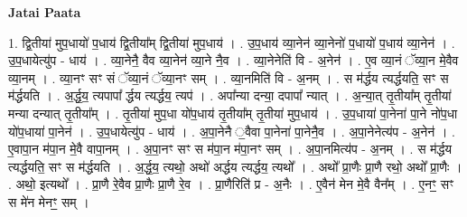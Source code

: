 \documentclass[17pt]{extarticle}
\begin{document}
\textbf{Jatai Paata} \newline

1. द्वि॒तीया॑ मुप॒धायो॑ प॒धाय॑ द्वि॒तीया᳚म् द्वि॒तीया॑ मुप॒धाय॑ । . उ॒प॒धाय॑ व्या॒नेन॑ व्या॒नेनो॑ प॒धायो॑ प॒धाय॑ व्या॒नेन॑ । . उ॒प॒धायेत्यु॑प - धाय॑ । . व्या॒नेनै॒ वैव व्या॒नेन॑ व्या॒ने नै॒व । . व्या॒नेनेति॑ वि - अ॒नेन॑ । . ए॒व व्या॒नं ॅव्या॒न मे॒वैव व्या॒नम् । . व्या॒नꣳ सꣳ सं ॅव्या॒नं ॅव्या॒नꣳ सम् । . व्या॒नमिति॑ वि - अ॒नम् । . स म॑र्द्धय त्यर्द्धयति॒ सꣳ स म॑र्द्धयति । . अ॒र्द्ध॒य॒ त्यपापा᳚ र्द्धय त्यर्द्धय॒ त्यप॑ । . अपा᳚न्या दन्या॒ दपापा᳚ न्यात् । . अ॒न्या॒त् तृ॒तीया᳚म् तृ॒तीया॑ मन्या दन्यात् तृ॒तीया᳚म् । . तृ॒तीया॑ मुप॒धा यो॑प॒धाय॑ तृ॒तीया᳚म् तृ॒तीया॑ मुप॒धाय॑ । . उ॒प॒धाया॑ पा॒नेना॑ पा॒ने नो॑प॒धा यो॑प॒धाया॑ पा॒नेन॑ । . उ॒प॒धायेत्यु॑प - धाय॑ । . अ॒पा॒नेनै ॒वैवा पा॒नेना॑ पा॒नेनै॒व । . अ॒पा॒नेनेत्य॑प - अ॒नेन॑ । . ए॒वापा॒न म॑पा॒न मे॒वै वापा॒नम् । . अ॒पा॒नꣳ सꣳ स म॑पा॒न म॑पा॒नꣳ सम् । . अ॒पा॒नमित्य॑प - अ॒नम् । . स म॑र्द्धय त्यर्द्धयति॒ सꣳ स म॑र्द्धयति । . अ॒र्द्ध॒य॒ त्यथो॒ अथो॑ अर्द्धय त्यर्द्धय॒ त्यथो᳚ । . अथो᳚ प्रा॒णैः प्रा॒णै रथो॒ अथो᳚ प्रा॒णैः । . अथो॒ इत्यथो᳚ । . प्रा॒णै रे॒वैव प्रा॒णैः प्रा॒णै रे॒व । . प्रा॒णैरिति॑ प्र - अ॒नैः । . ए॒वैन॑ मेन मे॒वै वैन᳚म् । . ए॒नꣳ॒॒ सꣳ स मे॑न मेनꣳ॒॒ सम् । \newline
\end{document}
